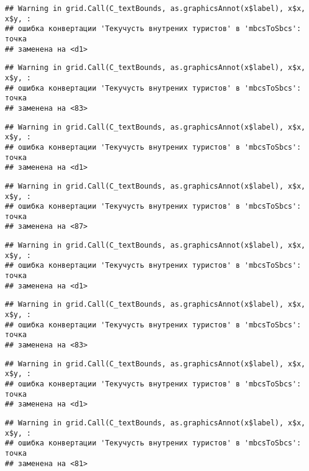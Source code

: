 \documentclass[
]{article}
\begin{document}
\begin{verbatim}
## Warning in grid.Call(C_textBounds, as.graphicsAnnot(x$label), x$x, x$y, :
## ошибка конвертации 'Текучусть внутрених туристов' в 'mbcsToSbcs': точка
## заменена на <d1>
\end{verbatim}

\begin{verbatim}
## Warning in grid.Call(C_textBounds, as.graphicsAnnot(x$label), x$x, x$y, :
## ошибка конвертации 'Текучусть внутрених туристов' в 'mbcsToSbcs': точка
## заменена на <83>
\end{verbatim}

\begin{verbatim}
## Warning in grid.Call(C_textBounds, as.graphicsAnnot(x$label), x$x, x$y, :
## ошибка конвертации 'Текучусть внутрених туристов' в 'mbcsToSbcs': точка
## заменена на <d1>
\end{verbatim}

\begin{verbatim}
## Warning in grid.Call(C_textBounds, as.graphicsAnnot(x$label), x$x, x$y, :
## ошибка конвертации 'Текучусть внутрених туристов' в 'mbcsToSbcs': точка
## заменена на <87>
\end{verbatim}

\begin{verbatim}
## Warning in grid.Call(C_textBounds, as.graphicsAnnot(x$label), x$x, x$y, :
## ошибка конвертации 'Текучусть внутрених туристов' в 'mbcsToSbcs': точка
## заменена на <d1>
\end{verbatim}

\begin{verbatim}
## Warning in grid.Call(C_textBounds, as.graphicsAnnot(x$label), x$x, x$y, :
## ошибка конвертации 'Текучусть внутрених туристов' в 'mbcsToSbcs': точка
## заменена на <83>
\end{verbatim}

\begin{verbatim}
## Warning in grid.Call(C_textBounds, as.graphicsAnnot(x$label), x$x, x$y, :
## ошибка конвертации 'Текучусть внутрених туристов' в 'mbcsToSbcs': точка
## заменена на <d1>
\end{verbatim}

\begin{verbatim}
## Warning in grid.Call(C_textBounds, as.graphicsAnnot(x$label), x$x, x$y, :
## ошибка конвертации 'Текучусть внутрених туристов' в 'mbcsToSbcs': точка
## заменена на <81>
\end{verbatim}
\end{document}
